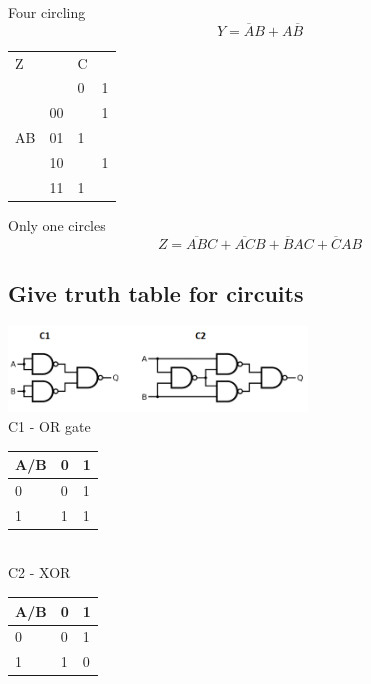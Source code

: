 \documentclass[12pt, a4paper]{article}
\begin{document}
				Four circling
				$$Y=\overline{A}B+A\overline{B}$$
				\begin{table}[h!]
				\begin{tabular}{llll}
				Z                       &                         & C                      &                        \\ \cline{3-4} 
				                        & \multicolumn{1}{l|}{}   & \multicolumn{1}{l|}{0} & \multicolumn{1}{l|}{1} \\ \cline{2-4} 
				\multicolumn{1}{l|}{}   & \multicolumn{1}{l|}{00} & \multicolumn{1}{l|}{}  & \multicolumn{1}{l|}{1} \\ \cline{2-4} 
				\multicolumn{1}{l|}{AB} & \multicolumn{1}{l|}{01} & \multicolumn{1}{l|}{1} & \multicolumn{1}{l|}{}  \\ \cline{2-4} 
				\multicolumn{1}{l|}{}   & \multicolumn{1}{l|}{10} & \multicolumn{1}{l|}{}  & \multicolumn{1}{l|}{1} \\ \cline{2-4} 
				\multicolumn{1}{l|}{}   & \multicolumn{1}{l|}{11} & \multicolumn{1}{l|}{1} & \multicolumn{1}{l|}{}  \\ \cline{2-4} 
				\end{tabular}
				\end{table}
				Only one circles
				$$Z=\overline{AB}C+\overline{AC}B+\overline{B}AC+\overline{C}AB$$
		\subsection{Give truth table for circuits}
			\includegraphics[width=300px]{assets/164e.png}\\
			C1 - OR gate
			\begin{table}[h!]
			\begin{tabular}{|l|l|l|}
			\hline
			A/B & 0 & 1 \\ \hline
			0   & 0 & 1 \\ \hline
			1   & 1 & 1 \\ \hline
			\end{tabular}
			\end{table}\\
			C2 - XOR
			\begin{table}[h!]
			\begin{tabular}{|l|l|l|}
			\hline
			A/B & 0 & 1 \\ \hline
			0   & 0 & 1 \\ \hline
			1   & 1 & 0 \\ \hline
			\end{tabular}
			\end{table}
\end{document}
